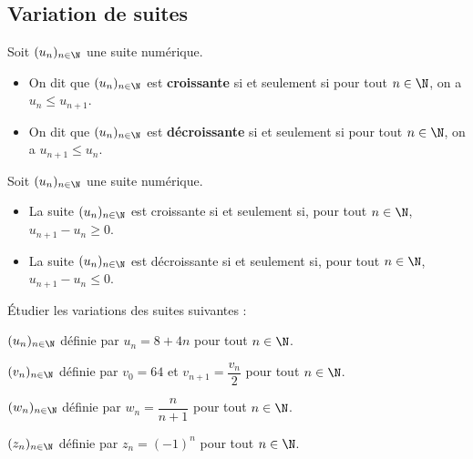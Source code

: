 \documentclass{article}
\begin{document}
\subsection{Variation de suites}
\begin{tcolorbox}
\begin{definition}
Soit $(u_n)_{n \in \N}$ une suite numérique.
\begin{itemize}
\item On dit que $(u_n)_{n \in \N}$ est \textbf{croissante} si et seulement si pour tout $n \in \N$, on a $u_n \leq u_{n+1}$. 
\item On dit que $(u_n)_{n \in \N}$ est \textbf{décroissante} si et seulement si pour tout $n \in \N$, on a $u_{n+1} \leq u_n$. 
\end{itemize}
\end{definition}
\end{tcolorbox}
\begin{proposition}
Soit $(u_n)_{n \in \N}$ une suite numérique.
\begin{itemize}
\item La suite $(u_n)_{n \in \N}$ est croissante si et seulement si, pour tout $n \in \N$, $u_{n+1} - u_n \geq 0$. 
\item La suite $(u_n)_{n \in \N}$ est décroissante si et seulement si, pour tout $n \in \N$, $u_{n+1} - u_n \leq 0$. 
\end{itemize}
\end{proposition}
\begin{example}
Étudier les variations des suites suivantes :
\begin{enumquestions}
\item $(u_n)_{n \in \N}$ définie par $u_n = 8 + 4n$ pour tout $n \in \N$.
\item $(v_n)_{n \in \N}$ définie par $v_0 = 64$ et $v_{n+1} = \dfrac{v_n}{2}$ pour tout $n \in \N$.
\item $(w_n)_{n \in \N}$ définie par $w_n = \dfrac{n}{n+1}$ pour tout $n \in \N$.
\item $(z_n)_{n \in \N}$ définie par $z_n = (-1)^n$ pour tout $n \in \N$.
\end{enumquestions}
\emptybox{6cm}
\end{example}
\end{document}
